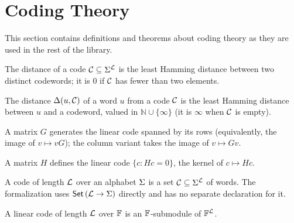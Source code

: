 \section{Coding Theory}\label{sec:coding_theory}

This section contains definitions and theorems about coding theory as they are used in the rest of the library.

\begin{definition}
    \label{def:code_distance}
    \leanok
    The distance of a code $\mathcal{C}\subseteq\Sigma^{\mathcal{L}}$ is the least Hamming distance
    between two distinct codewords; it is $0$ if $\mathcal{C}$ has fewer than two elements.
\end{definition}

\begin{definition}
    \label{def:distance_from_code}
    \leanok
    The distance $\Delta(u,\mathcal{C})$ of a word $u$ from a code $\mathcal{C}$ is the least Hamming distance
    between $u$ and a codeword, valued in $\mathbb{N}\cup\{\infty\}$ (it is $\infty$ when
    $\mathcal{C}$ is empty).
\end{definition}

\begin{definition}
    \label{def:generator_matrix}
    \leanok
    A matrix $G$ generates the linear code spanned by its rows (equivalently, the image of
    $v\mapsto vG$); the column variant takes the image of $v\mapsto Gv$.
\end{definition}

\begin{definition}
    \label{def:parity_check_matrix}
    \leanok
    A matrix $H$ defines the linear code $\{c : Hc = 0\}$, the kernel of $c\mapsto Hc$.
\end{definition}

\begin{definition}[Code]
    \label{def:code}
    A code of length $\mathcal{L}$ over an alphabet $\Sigma$ is a set
    $\mathcal{C}\subseteq\Sigma^{\mathcal{L}}$ of words. The formalization uses
    $\mathsf{Set}\,(\mathcal{L}\to\Sigma)$ directly and has no separate declaration for it.
\end{definition}

\begin{definition}
    \label{def:linear_code}
    \leanok
    A linear code of length $\mathcal{L}$ over $\mathbb{F}$ is an $\mathbb{F}$-submodule of
    $\mathbb{F}^{\mathcal{L}}$.
\end{definition}

